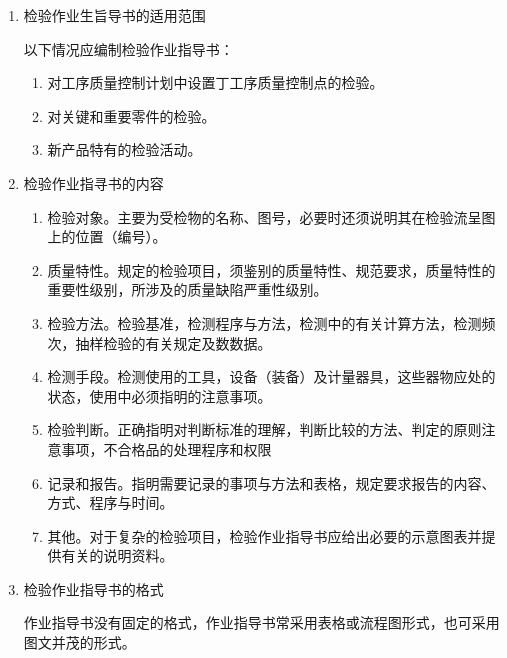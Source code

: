     \begin{enumerate}
        \item 检验作业生旨导书的适用范围

        以下情况应编制检验作业指导书：

            \begin{enumerate}
                \item 对工序质量控制计划中设置丁工序质量控制点的检验。

                \item 对关键和重要零件的检验。

                \item 新产品特有的检验活动。

            \end{enumerate}
        \item 检验作业指寻书的内容

            \begin{enumerate}
                \item 检验对象。主要为受检物的名称、图号，必要时还须说明其在检验流呈图上的位置（编号）。

                \item 质量特性。规定的检验项目，须鉴别的质量特性、规范要求，质量特性的重要性级别，所涉及的质量缺陷严重性级别。

                \item 检验方法。检验基准，检测程序与方法，检测中的有关计算方法，检测频次，抽样检验的有关规定及数数据。

                \item 检测手段。检测使用的工具，设备（装备）及计量器具，这些器物应处的状态，使用中必须指明的注意事项。

                \item 检验判断。正确指明对判断标准的理解，判断比较的方法、判定的原则注意事项，不合格品的处理程序和权限

                \item 记录和报告。指明需要记录的事项与方法和表格，规定要求报告的内容、方式、程序与时间。

                \item 其他。对于复杂的检验项目，检验作业指导书应给出必要的示意图表并提供有关的说明资料。

            \end{enumerate}

        \item 检验作业指导书的格式

        作业指导书没有固定的格式，作业指导书常采用表格或流程图形式，也可采用图文并茂的形式。

    \end{enumerate}

